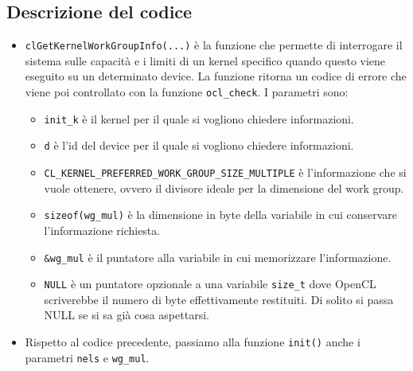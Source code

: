 \subsection*{Descrizione del codice}
\begin{itemize}
    \item \texttt{clGetKernelWorkGroupInfo(...)} è la funzione che permette di interrogare il sistema sulle capacità e i limiti di un kernel specifico quando questo viene eseguito su un determinato device. La funzione ritorna un codice di errore che viene poi controllato con la funzione \texttt{ocl\_check}. I parametri sono:
    \begin{itemize}
        \item \texttt{init\_k} è il kernel per il quale si vogliono chiedere informazioni.
        
        \item \texttt{d} è l'id del device per il quale si vogliono chiedere informazioni.
        
        \item \texttt{CL\_KERNEL\_PREFERRED\_WORK\_GROUP\_SIZE\_MULTIPLE} è l'informazione che si vuole ottenere, ovvero il divisore ideale per la dimensione del work group.
        
        \item \texttt{sizeof(wg\_mul)} è la dimensione in byte della variabile in cui conservare l'informazione richiesta.
        
        \item \texttt{\&wg\_mul} è il puntatore alla variabile in cui memorizzare l'informazione.
        
        \item \texttt{NULL} è un puntatore opzionale a una variabile \texttt{size\_t} dove OpenCL scriverebbe il numero di byte effettivamente restituiti. Di solito si passa NULL se si sa già cosa aspettarsi.
    \end{itemize}
    
    \item Rispetto al codice precedente, passiamo alla funzione \texttt{init()} anche i parametri \texttt{nels} e \texttt{wg\_mul}.
\end{itemize}

